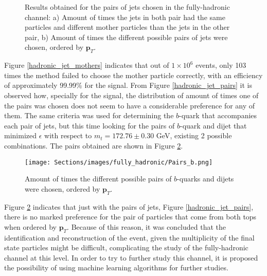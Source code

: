 \begin{figure}[ht!]
     \begin{center}
    \end{center}
    \vspace{-1\baselineskip}
    \caption{Results obtained for the pairs of jets chosen in the fully-hadronic channel: a) Amount of times the jets in both pair had the same particles and different mother particles than the jets in the other pair, b) Amount of times the different possible pairs of jets were chosen, ordered by $\bm{p}_T$.} 
   \label{hadronic_jet_results}
\end{figure}

Figure \ref{hadronic_jet_mothers} indicates that out of $1\times10^6$ events, only 103 times the method failed to choose the mother particle correctly, with an efficiency of approximately 99.99\% for the signal. From Figure \ref{hadronic_jet_pairs} it is observed how, specially for the signal, the distribution of amount of times one of the pairs was chosen does not seem to have a considerable preference for any of them. The same criteria was used for determining the $b$-quark that accompanies each pair of jets, but this time looking for the pairs of $b$-quark and dijet that minimized $\epsilon$ with respect to $m_t = 172.76 \pm 0.30$ GeV, existing 2 possible combinations. The pairs obtained are shown in Figure \ref{hadronic_bdijet_pairs}.

\begin{figure}[ht!]
    \centering
    \texttt{[image: Sections/images/fully\_hadronic/Pairs\_b.png]}
    \caption{Amount of times the different possible pairs of $b$-quarks and dijets were chosen, ordered by $\bm{p}_T$.}
    \label{hadronic_bdijet_pairs}
\end{figure}

Figure \ref{hadronic_bdijet_pairs} indicates that just with the pairs of jets, Figure \ref{hadronic_jet_pairs}, there is no marked preference for the pair of particles that come from both tops when ordered by $\bm{p}_T$. Because of this reason, it was concluded that the identification and reconstruction of the event, given the multiplicity of the final state particles might be difficult, complicating the study of the fully-hadronic channel at this level. In order to try to further study this channel, it is proposed the possibility of using machine learning algorithms for further studies.